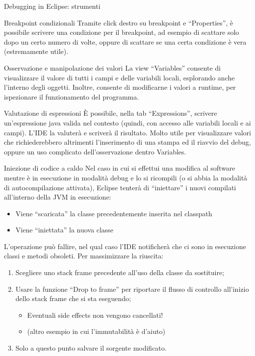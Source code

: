 \documentclass[presentation]{beamer}
\begin{document}
\begin{frame}[allowframebreaks]{Debugging in Eclipse: strumenti}
	\begin{block}{Breakpoint condizionali}
		Tramite click destro su breakpoint e ``Properties'', è possibile scrivere una condizione per 
il breakpoint, ad esempio di scattare solo dopo un certo numero di volte, oppure di scattare se una 
certa condizione è vera (estremamente utile).
	\end{block}
	\begin{block}{Osservazione e manipolazione dei valori}
		La view ``Variables'' consente di visualizzare il valore di tutti i campi e delle variabili 
locali, esplorando anche l'interno degli oggetti. Inoltre, consente di modificarne i valori a 
runtime, per ispezionare il funzionamento del programma.
	\end{block}
	\begin{block}{Valutazione di espressioni}
		È possibile, nella tab ``Expressions'', scrivere un'espressione java valida nel contesto 
(quindi, con accesso alle variabili locali e ai campi). L'IDE la valuterà e scriverà il risultato. 
Molto utile per visualizzare valori che richiederebbero altrimenti l'inserimento di una stampa ed il 
riavvio del debug, oppure un uso complicato dell'osservazione dentro Variables.
	\end{block}
	\begin{block}{Iniezione di codice a caldo}
		Nel caso in cui si effettui una modifica al software mentre è in esecuzione in modalità 
debug e lo si ricompili (o si abbia la modalità di autocompilazione attivata), Eclipse tenterà di 
``iniettare'' i nuovi compilati all'interno della JVM in esecuzione:
		\begin{itemize}
			\item Viene ``scaricata'' la classe precedentemente inserita nel classpath
			\item Viene ``iniettata'' la nuova classe
		\end{itemize}
		L'operazione può fallire, nel qual caso l'IDE notificherà che ci sono in esecuzione classi e 
metodi obsoleti. Per massimizzare la riuscita:
		\begin{enumerate}
			\item Scegliere uno stack frame precedente all'uso della classe da sostituire;
			\item Usare la funzione ``Drop to frame'' per riportare il flusso di controllo 
all'inizio dello stack frame che si sta eseguendo;
			\begin{itemize}
				\item Eventuali side effects non vengono cancellati!
				\item (altro esempio in cui l'immutabilità è d'aiuto)
			\end{itemize}
			\item Solo a questo punto salvare il sorgente modificato.
		\end{enumerate}
	\end{block}
\end{frame}
\end{document}
